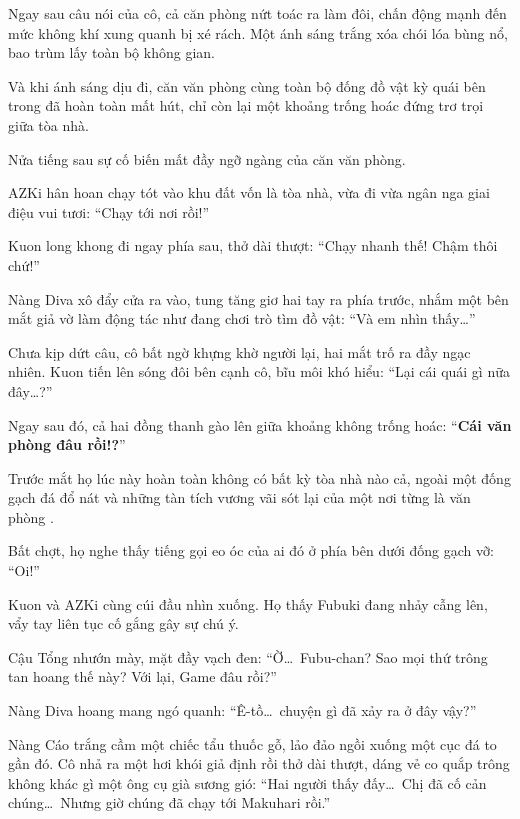 \documentclass[../main.tex]{subfiles}
\begin{document}
Ngay sau câu nói của cô, cả căn phòng nứt toác ra làm đôi, chấn động mạnh đến mức không khí xung quanh bị xé rách. Một ánh sáng trắng xóa chói lóa bùng nổ, bao trùm lấy toàn bộ không gian.

Và khi ánh sáng dịu đi, căn văn phòng cùng toàn bộ đống đồ vật kỳ quái bên trong đã hoàn toàn mất hút, chỉ còn lại một khoảng trống hoác đứng trơ trọi giữa tòa nhà.

\omk

Nửa tiếng sau sự cố biến mất đầy ngỡ ngàng của căn văn phòng.

AZKi hân hoan chạy tót vào khu đất vốn là tòa nhà, vừa đi vừa ngân nga giai điệu vui tươi: ``Chạy tới nơi rồi!''

Kuon long khong đi ngay phía sau, thở dài thượt: ``Chạy nhanh thế! Chậm thôi chứ!''

Nàng Diva xô đẩy cửa ra vào, tung tăng giơ hai tay ra phía trước, nhắm một bên mắt giả vờ làm động tác như đang chơi trò tìm đồ vật: ``Và em nhìn thấy\dots''

Chưa kịp dứt câu, cô bất ngờ khựng khờ người lại, hai mắt trố ra đầy ngạc nhiên. Kuon tiến lên sóng đôi bên cạnh cô, bĩu môi khó hiểu: ``Lại cái quái gì nữa đây\dots?''

Ngay sau đó, cả hai đồng thanh gào lên giữa khoảng không trống hoác: ``\textbf{Cái văn phòng đâu rồi!?}''

Trước mắt họ lúc này hoàn toàn không có bất kỳ tòa nhà nào cả, ngoài một đống gạch đá đổ nát và những tàn tích vương vãi sót lại của một nơi từng là văn phòng \hll.


Bất chợt, họ nghe thấy tiếng gọi eo óc của ai đó ở phía bên dưới đống gạch vỡ: ``Oi!''

Kuon và AZKi cùng cúi đầu nhìn xuống. Họ thấy Fubuki đang nhảy cẫng lên, vẩy tay liên tục cố gắng gây sự chú ý.


Cậu Tổng nhướn mày, mặt đầy vạch đen: ``Ờ\dots\ Fubu-chan? Sao mọi thứ trông tan hoang thế này? Với lại, Game đâu rồi?''

Nàng Diva hoang mang ngó quanh: ``Ê-tồ\dots\ chuyện gì đã xảy ra ở đây vậy?''

Nàng Cáo trắng cầm một chiếc tẩu thuốc gỗ, lảo đảo ngồi xuống một cục đá to gần đó. Cô nhả ra một hơi khói giả định rồi thở dài thượt, dáng vẻ co quắp trông không khác gì một ông cụ già sương gió: ``Hai người thấy đấy\dots\ Chị đã cố cản chúng\dots\ Nhưng giờ chúng đã chạy tới Makuhari rồi.''
\end{document}

